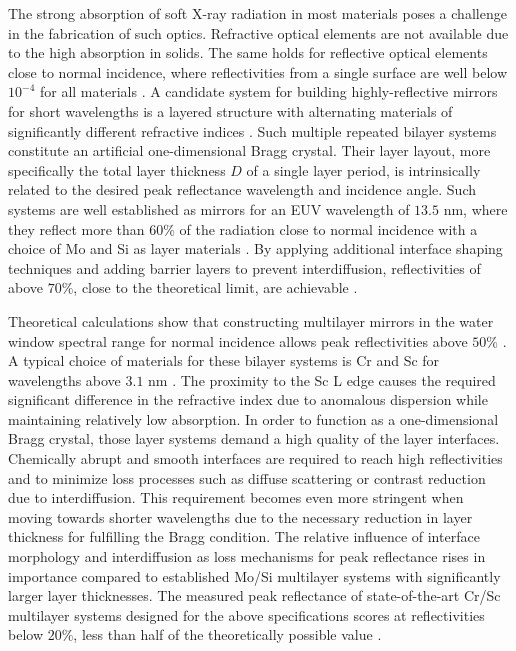 The strong absorption of soft X-ray radiation in most materials poses a 
challenge in the fabrication of such optics. Refractive optical elements are 
not available due to the high absorption in solids. The same holds for 
reflective optical elements close to normal incidence, where reflectivities 
from a single surface are well below $10^{-4}$ for all materials \cite{henke_x-ray_1993}. 
A candidate system for building highly-reflective mirrors for short wavelengths 
is a layered structure with alternating materials of significantly different 
refractive indices \cite{spiller_low-loss_1972}. Such multiple repeated bilayer 
systems constitute an artificial one-dimensional Bragg crystal. Their layer 
layout, more specifically the total layer thickness $D$ of a single layer 
period, is intrinsically related to the desired peak reflectance wavelength and 
incidence angle. Such systems are well established as mirrors for an EUV 
wavelength of $13.5$ nm, where they reflect more than $60\%$ of the radiation 
close to normal incidence with a choice of Mo and Si as layer materials 
\cite{barbee_molybdenum-silicon_1985,stearns_fabrication_1991}. By applying additional interface 
shaping techniques and adding barrier layers to prevent interdiffusion, 
reflectivities of above $70\%$, close to the theoretical limit, are achievable 
\cite{bajt_improved_2002,braun_grenzflachen-optimierte_2003}.

Theoretical calculations show that constructing multilayer mirrors in the water 
window spectral range for normal incidence allows peak reflectivities above 
$50\%$ \cite{schafers_cr/sc_1998}. A typical choice of materials for these bilayer 
systems is Cr and Sc for wavelengths above $3.1$ nm \cite{salashchenko_short-period_1997, 
schafers_cr/sc_1998}. The proximity to the Sc L edge causes the required significant 
difference in the refractive index due to anomalous dispersion while 
maintaining relatively low absorption. In order to function as a 
one-dimensional Bragg crystal, those layer systems demand a high quality of the 
layer interfaces. Chemically abrupt and smooth interfaces are required to reach 
high reflectivities and to minimize loss processes such as diffuse scattering 
or contrast reduction due to interdiffusion. This requirement becomes even more 
stringent when moving towards shorter wavelengths due to the necessary 
reduction in layer thickness for fulfilling the Bragg condition.
The relative influence of interface morphology and interdiffusion as loss 
mechanisms for peak reflectance rises in importance compared to established 
Mo/Si multilayer systems with significantly larger layer thicknesses. The 
measured peak reflectance of state-of-the-art Cr/Sc multilayer systems designed 
for the above specifications scores at reflectivities below $20\%$, less than 
half of the theoretically possible value \cite{eriksson_14.5_2003, 
yulin_high-performance_2004}.

